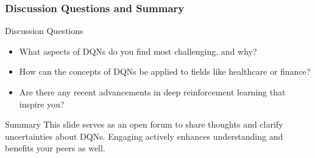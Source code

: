 \documentclass[aspectratio=169]{beamer}
\begin{document}
\begin{frame}[fragile]
    \frametitle{Discussion Questions and Summary}
    \begin{block}{Discussion Questions}
        \begin{itemize}
            \item What aspects of DQNs do you find most challenging, and why?
            \item How can the concepts of DQNs be applied to fields like healthcare or finance?
            \item Are there any recent advancements in deep reinforcement learning that inspire you?
        \end{itemize}
    \end{block}
    
    \begin{block}{Summary}
        This slide serves as an open forum to share thoughts and clarify uncertainties about DQNs. 
        Engaging actively enhances understanding and benefits your peers as well.
    \end{block}
\end{frame}
\end{document}
